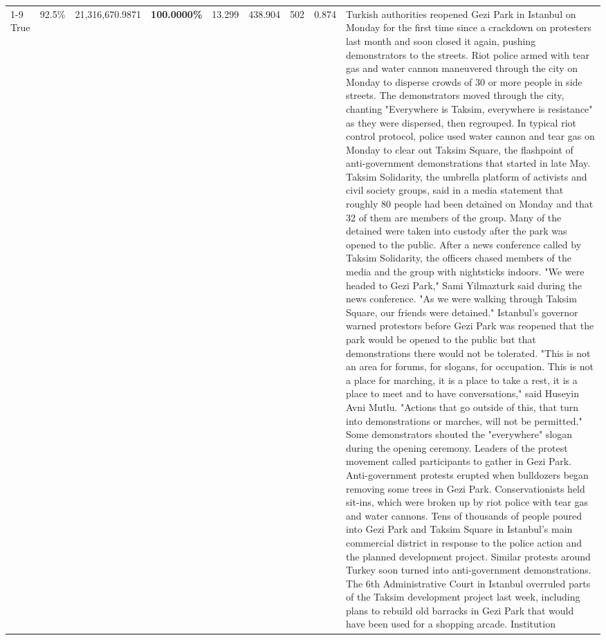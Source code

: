 \begin{table}[H]
\begin{tabular}{lllrlllll}
\cline{1-9}
True & 92.5\% & 21,316,670.9871 & \bfseries \color{red} 100.0000\% & 13.299 & 438.904 & 502 & 0.874 & Turkish authorities reopened Gezi Park in Istanbul on Monday for the first time since a crackdown on protesters last month and soon closed it again, pushing demonstrators to the streets. Riot police armed with tear gas and water cannon maneuvered through the city on Monday to disperse crowds of 30 or more people in side streets. The demonstrators moved through the city, chanting "Everywhere is Taksim, everywhere is resistance" as they were dispersed, then regrouped. In typical riot control protocol, police used water cannon and tear gas on Monday to clear out Taksim Square, the flashpoint of anti-government demonstrations that started in late May. Taksim Solidarity, the umbrella platform of activists and civil society groups, said in a media statement that roughly 80 people had been detained on Monday and that 32 of them are members of the group. Many of the detained were taken into custody after the park was opened to the public. After a news conference called by Taksim Solidarity, the officers chased members of the media and the group with nightsticks indoors. "We were headed to Gezi Park," Sami Yilmazturk said during the news conference. "As we were walking through Taksim Square, our friends were detained." Istanbul's governor warned protestors before Gezi Park was reopened that the park would be opened to the public but that demonstrations there would not be tolerated. "This is not an area for forums, for slogans, for occupation. This is not a place for marching, it is a place to take a rest, it is a place to meet and to have conversations," said Huseyin Avni Mutlu. "Actions that go outside of this, that turn into demonstrations or marches, will not be permitted." Some demonstrators shouted the "everywhere" slogan during the opening ceremony. Leaders of the protest movement called participants to gather in Gezi Park. Anti-government protests erupted when bulldozers began removing some trees in Gezi Park. Conservationists held sit-ins, which were broken up by riot police with tear gas and water cannons. Tens of thousands of people poured into Gezi Park and Taksim Square in Istanbul's main commercial district in response to the police action and the planned development project. Similar protests around Turkey soon turned into anti-government demonstrations. The 6th Administrative Court in Istanbul overruled parts of the Taksim development project last week, including plans to rebuild old barracks in Gezi Park that would have been used for a shopping arcade. Institution \\

\end{tabular}
\end{table}
